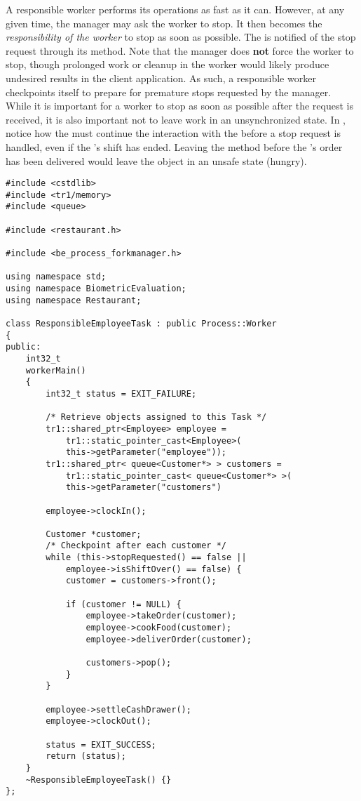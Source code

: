 A responsible worker performs its operations as fast as it can.
However, at any given time, the manager may ask the worker to
stop.  It then becomes the {\em responsibility of the worker} to 
stop as soon as possible.  The  is notified of the stop request
through its  method.  Note that the
manager does \textbf{not} force the worker to stop, though
prolonged work or cleanup in the worker would likely produce
undesired results in the client application.  As such, a responsible
worker checkpoints itself to prepare for premature stops requested by
the manager. While it is important for a worker to stop as soon
as possible after the request is received, it is also important not to leave
work in an unsynchronized state.  In ,
notice how
the  must continue the interaction with the 
before a stop request is handled, even if the 's shift has
ended.  Leaving the method before the 's order has been
delivered would leave the  object in an unsafe state (hungry). 

\begin{lstlisting}[caption={A Responsible \class{Worker} Implementation}, label=lst:process_worker-example]
#include <cstdlib>
#include <tr1/memory>
#include <queue>

#include <restaurant.h>

#include <be_process_forkmanager.h>

using namespace std;
using namespace BiometricEvaluation;
using namespace Restaurant;

class ResponsibleEmployeeTask : public Process::Worker
{
public:
	int32_t
	workerMain()
	{
		int32_t status = EXIT_FAILURE;
		
		/* Retrieve objects assigned to this Task */
		tr1::shared_ptr<Employee> employee =
		    tr1::static_pointer_cast<Employee>(
		    this->getParameter("employee"));
		tr1::shared_ptr< queue<Customer*> > customers = 
		    tr1::static_pointer_cast< queue<Customer*> >(
		    this->getParameter("customers")
		
		employee->clockIn();
		
		Customer *customer;
		/* Checkpoint after each customer */
		while (this->stopRequested() == false ||
		    employee->isShiftOver() == false) {
			customer = customers->front();
			
			if (customer != NULL) {
				employee->takeOrder(customer);
				employee->cookFood(customer);
				employee->deliverOrder(customer);
				
				customers->pop();
			}
		}
		
		employee->settleCashDrawer();
		employee->clockOut();
		
		status = EXIT_SUCCESS;
		return (status);
	}
	~ResponsibleEmployeeTask() {}
};
\end{lstlisting}

